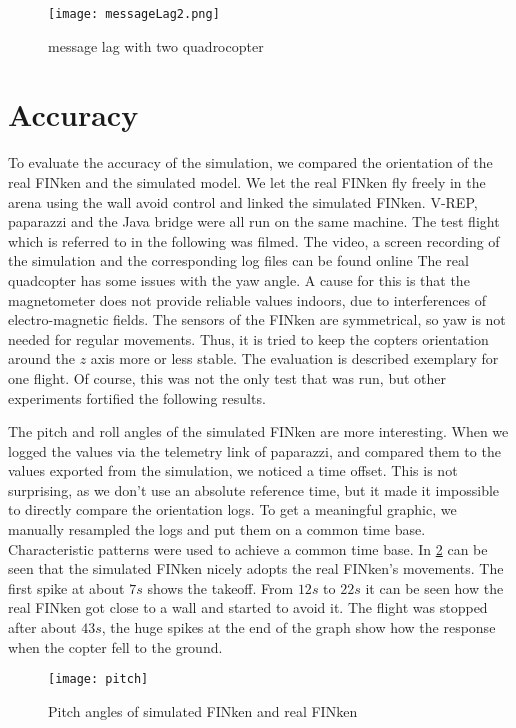 \begin{figure}[h!]
 \begin{center}
  \texttt{[image: messageLag2.png]}
 \end{center}
  \caption{message lag with two quadrocopter\label{fig:messageLag2}}
\end{figure}



\section{Accuracy}
\label{sec:accuracy}
To evaluate the accuracy of the simulation, we compared the orientation of the real FINken and the simulated model.  
We let the real FINken fly freely in the arena using the wall avoid control and linked the simulated FINken.
V-REP, paparazzi and the Java bridge were all run on the same machine.
The test flight which is referred to in the following was filmed.
The video, a screen recording of the simulation and the corresponding log files can be found online  
The real quadcopter has some issues with the yaw angle. 
A cause for this is that the magnetometer does not provide reliable values indoors, due to interferences of electro-magnetic fields.
The sensors of the FINken are symmetrical, so yaw is not needed for regular movements.
Thus, it is tried to keep the copters orientation around the $z$ axis more or less stable.
The evaluation is described exemplary for one flight. 
Of course, this was not the only test that was run, but other experiments fortified the following results.

The pitch and roll angles of the simulated FINken are more interesting.
When we logged the values via the telemetry link of paparazzi, and compared them to the values exported from the simulation, we noticed a time offset. 
This is not surprising, as we don't use an absolute reference time, but it made it impossible to directly compare the orientation logs.
To get a meaningful graphic, we manually resampled the logs and put them on a common time base.
Characteristic patterns were used to achieve a common time base.
In \ref{pic:pitchResponse} can be seen that the simulated FINken nicely adopts the real FINken's movements. 
The first spike at about $7s$ shows the takeoff. 
From $12s$ to $22s$ it can be seen how the real FINken got close to a wall and started to avoid it. 
The flight was stopped after about $43s$, the huge spikes at the end of the graph show how the response when the copter fell to the ground.
\begin{figure}
	\begin{center}
	\texttt{[image: pitch]}
	\caption{Pitch angles of simulated FINken and real FINken}
	\label{pic:pitchResponse}
	\end{center}
\end{figure}

